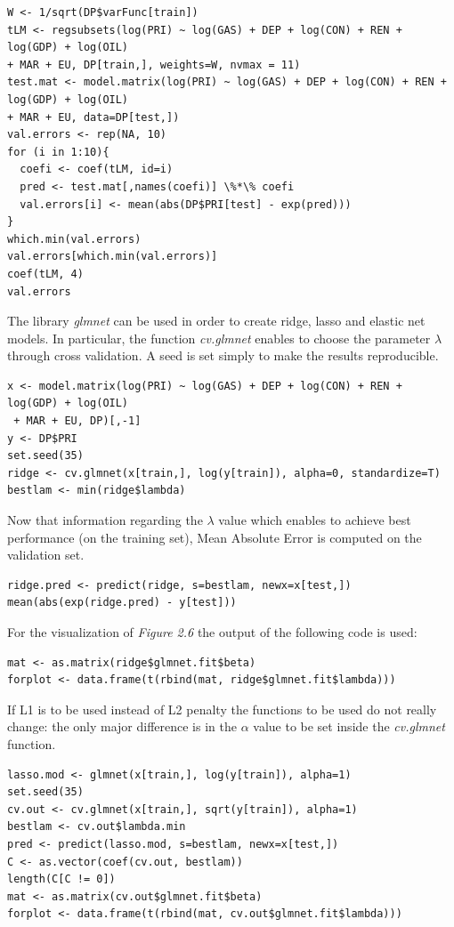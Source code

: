 \documentclass{book}
\begin{document}
\begin{verbatim}
W <- 1/sqrt(DP$varFunc[train])
tLM <- regsubsets(log(PRI) ~ log(GAS) + DEP + log(CON) + REN + log(GDP) + log(OIL)
+ MAR + EU, DP[train,], weights=W, nvmax = 11)
test.mat <- model.matrix(log(PRI) ~ log(GAS) + DEP + log(CON) + REN + log(GDP) + log(OIL)
+ MAR + EU, data=DP[test,])
val.errors <- rep(NA, 10)
for (i in 1:10){
  coefi <- coef(tLM, id=i)
  pred <- test.mat[,names(coefi)] \%*\% coefi
  val.errors[i] <- mean(abs(DP$PRI[test] - exp(pred)))
}
which.min(val.errors)
val.errors[which.min(val.errors)]
coef(tLM, 4)
val.errors
\end{verbatim}

The library \textit{glmnet} can be used in order to create ridge, lasso and elastic net models. In particular, the function \textit{cv.glmnet} enables to choose the parameter $\lambda$ through cross validation. A seed is set simply to make the results reproducible.

\begin{verbatim}
x <- model.matrix(log(PRI) ~ log(GAS) + DEP + log(CON) + REN + log(GDP) + log(OIL)
 + MAR + EU, DP)[,-1]
y <- DP$PRI
set.seed(35)
ridge <- cv.glmnet(x[train,], log(y[train]), alpha=0, standardize=T)
bestlam <- min(ridge$lambda)
\end{verbatim}

Now that information regarding the $\lambda$ value which enables to achieve best performance (on the training set), Mean Absolute Error is computed on the validation set.

\begin{verbatim}
ridge.pred <- predict(ridge, s=bestlam, newx=x[test,])
mean(abs(exp(ridge.pred) - y[test]))
\end{verbatim}

For the visualization of \textit{Figure 2.6} the output of the following code is used:

\begin{verbatim}
mat <- as.matrix(ridge$glmnet.fit$beta)
forplot <- data.frame(t(rbind(mat, ridge$glmnet.fit$lambda)))
\end{verbatim}

If L1 is to be used instead of L2 penalty the functions to be used do not really change: the only major difference is in the $\alpha$ value to be set inside the \textit{cv.glmnet} function. 

\begin{verbatim}
lasso.mod <- glmnet(x[train,], log(y[train]), alpha=1)
set.seed(35)
cv.out <- cv.glmnet(x[train,], sqrt(y[train]), alpha=1)
bestlam <- cv.out$lambda.min
pred <- predict(lasso.mod, s=bestlam, newx=x[test,])
C <- as.vector(coef(cv.out, bestlam))
length(C[C != 0])
mat <- as.matrix(cv.out$glmnet.fit$beta)
forplot <- data.frame(t(rbind(mat, cv.out$glmnet.fit$lambda)))
\end{verbatim}
\end{document}
